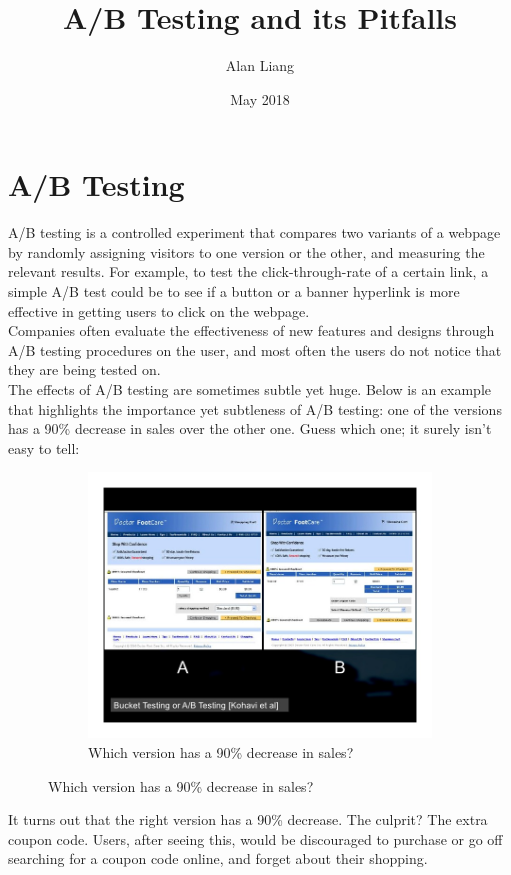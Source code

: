 \documentclass{article}
\title{A/B Testing and its Pitfalls}
\author{Alan Liang}
\date{May 2018}
\begin{document}
\maketitle
\section{A/B Testing}
A/B testing is a controlled experiment that compares two variants of a webpage by randomly assigning visitors to one version or the other, and measuring the relevant results.
For example, to test the click-through-rate of a certain link, a simple A/B test could be to see if a button or a banner hyperlink is more effective in getting users to click on the webpage.
\\
Companies often evaluate the effectiveness of new features and designs through A/B testing procedures on the user, and most often the users do not notice that they are being tested on.
\\
The effects of A/B testing are sometimes subtle yet huge.
Below is an example that highlights the importance yet subtleness of A/B testing: one of the versions has a 90\% decrease in sales over the other one. 
Guess which one; it surely isn't easy to tell:
\begin{figure}[h!]
  \centering
  \begin{subfigure}[b]{0.7\linewidth}
    \includegraphics[width=\linewidth]{ABtesting-example.jpg}
    \caption{Which version has a 90\% decrease in sales?}
  \end{subfigure} 
\end{figure}
It turns out that the right version has a 90\% decrease. 
The culprit? The extra coupon code.
Users, after seeing this, would be discouraged to purchase or go off searching for a coupon code online, and forget about their shopping. 
\end{document}
